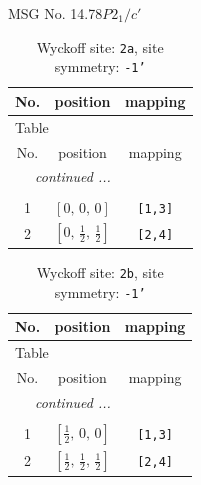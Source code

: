 \documentclass[fleqn,8pt]{jsarticle}
\begin{document}
\setcounter{MaxMatrixCols}{32}

\renewcommand{\tablename}{Table~}
\renewcommand{\figurename}{Figure~}
\begin{center}
\LARGE
MSG No. 14.78\quad$P2_{1}/c'$
\end{center}
\renewcommand{\arraystretch}{1.2}
\begin{longtable}{ccc}
\caption{Wyckoff site: {\tt 2a}, site symmetry: {\tt -1'}}
 \\
 \hline \hline
No. & position & mapping \\ \hline \endfirsthead

\multicolumn{2}{l}{\tablename\ \thetable{}} \\
 \hline \hline
No. & position & mapping \\ \hline \endhead

 \hline \hline
\multicolumn{2}{r}{\footnotesize\it continued ...} \\ \endfoot

 \hline \hline
\multicolumn{2}{r}{} \\ \endlastfoot

1 & $\left[ 0,\, 0,\, 0 \right]$ & {\tt [1,3]} \\ \hline
2 & $\left[ 0,\, \frac{1}{2},\, \frac{1}{2} \right]$ & {\tt [2,4]} \\
\end{longtable}
\renewcommand{\arraystretch}{1.2}
\begin{longtable}{ccc}
\caption{Wyckoff site: {\tt 2b}, site symmetry: {\tt -1'}}
 \\
 \hline \hline
No. & position & mapping \\ \hline \endfirsthead

\multicolumn{2}{l}{\tablename\ \thetable{}} \\
 \hline \hline
No. & position & mapping \\ \hline \endhead

 \hline \hline
\multicolumn{2}{r}{\footnotesize\it continued ...} \\ \endfoot

 \hline \hline
\multicolumn{2}{r}{} \\ \endlastfoot

1 & $\left[ \frac{1}{2},\, 0,\, 0 \right]$ & {\tt [1,3]} \\ \hline
2 & $\left[ \frac{1}{2},\, \frac{1}{2},\, \frac{1}{2} \right]$ & {\tt [2,4]} \\
\end{longtable}
\renewcommand{\arraystretch}{1.2}
\end{document}
